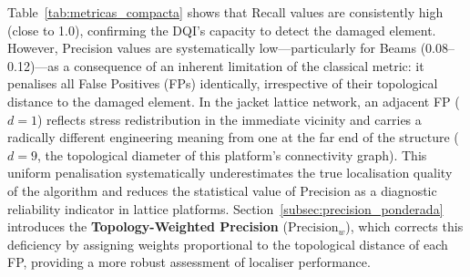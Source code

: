 \documentclass[preprint,12pt]{elsarticle}
\begin{document}
Table~\ref{tab:metricas_compacta} shows that Recall values are consistently high (close to 1.0),
confirming the DQI's capacity to detect the damaged element. However, Precision values are
systematically low---particularly for Beams (0.08--0.12)---as a consequence of an inherent
limitation of the classical metric: it penalises all False Positives (FPs) identically,
irrespective of their topological distance to the damaged element. In the jacket lattice
network, an adjacent FP ($d=1$) reflects stress redistribution in the immediate vicinity and
carries a radically different engineering meaning from one at the far end of the structure
($d=9$, the topological diameter of this platform's connectivity graph). This uniform penalisation systematically underestimates the true localisation quality
of the algorithm and reduces the statistical value of Precision as a diagnostic reliability
indicator in lattice platforms. Section~\ref{subsec:precision_ponderada} introduces the
\textbf{Topology-Weighted Precision} ($\text{Precision}_w$), which corrects this deficiency
by assigning weights proportional to the topological distance of each FP, providing a more
robust assessment of localiser performance.
\end{document}
